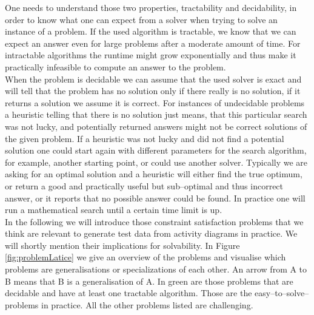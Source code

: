 One needs to understand those two properties, tractability and decidability, in order to know what one can expect from a solver when trying to solve an instance of a problem. If the used algorithm is tractable, we know that we can expect an answer even for large problems after a moderate amount of time. For intractable algorithms the runtime might grow exponentially and thus make it practically infeasible to compute an answer to the problem.\\
When the problem is decidable we can assume that the used solver is exact and will tell that the problem has no solution only if there really is no solution, if it returns a solution we assume it is correct. For instances of undecidable problems a heuristic telling that there is no solution just means, that this particular search was not lucky, and potentially returned answers might not be correct solutions of the given problem. If a heuristic was not lucky and did not find a potential solution one could start again with different parameters for the search algorithm, for example, another starting point, or could use another solver. Typically we are asking for an optimal solution and a heuristic will either find the true optimum, or return a good and practically useful but sub--optimal and thus incorrect answer, or it reports that no possible answer could be found. In practice one will run a mathematical search until a certain time limit is up.\\
In the following we will introduce those constraint satisfaction problems that we think are relevant to generate test data from activity diagrams in practice. We will shortly mention their implications for solvability. In Figure \ref{fig:problemLatice} we give an overview of the problems and visualise which problems are generalisations or specializations of each other. An arrow from A to B means that B is a generalisation of A. In green are those problems that are decidable and have at least one tractable algorithm. Those are the easy--to--solve--problems in practice. All the other problems listed are challenging.
